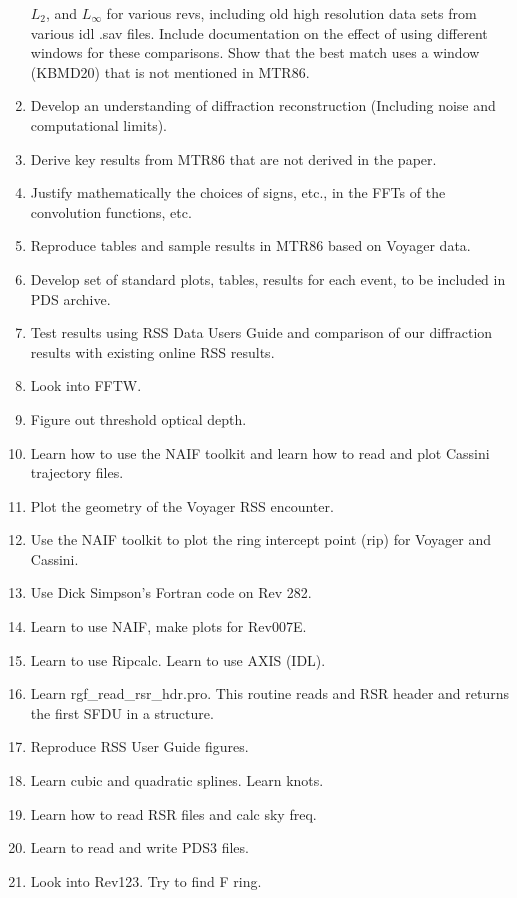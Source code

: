 \documentclass[crop=false,class=article,oneside]{standalone}
\begin{document}
\begin{enumerate}
                  $L_{2}$, and $L_{\infty}$ for various revs, including
                  old high resolution data sets from various idl .sav
                  files. Include documentation on the effect of using
                  different windows for these comparisons. Show that
                  the best match uses a window (KBMD20) that is not
                  mentioned in MTR86.
            \item Develop an understanding of diffraction
                  reconstruction (Including noise
                  and computational limits).
            \item Derive key results from MTR86 that are not
                  derived in the paper.
            \item Justify mathematically the choices of signs, etc.,
                  in the FFTs of the convolution functions, etc.
            \item Reproduce tables and sample results in MTR86
                  based on Voyager data.
            \item Develop set of standard plots, tables, results
                  for each event, to be included in PDS archive.
            \item Test results using RSS Data Users Guide and
                  comparison of our diffraction results with
                  existing online RSS results.
            \item Look into FFTW.
            \item Figure out threshold optical depth.
            \item Learn how to use the NAIF toolkit and learn
                  how to read and plot Cassini trajectory files.
            \item Plot the geometry of the Voyager RSS encounter.
            \item Use the NAIF toolkit to plot the ring
                  intercept point (rip) for Voyager and Cassini.
            \item Use Dick Simpson's Fortran code on Rev 282.
            \item Learn to use NAIF, make plots for Rev007E.
            \item Learn to use Ripcalc. Learn to use AXIS (IDL).
            \item Learn rgf\_read\_rsr\_hdr.pro. 
                  This routine reads and RSR header and returns
                  the first SFDU in a structure.
            \item Reproduce RSS User Guide figures.
            \item Learn cubic and quadratic splines. Learn knots.
            \item Learn how to read RSR files and calc sky freq.
            \item Learn to read and write PDS3 files.
            \item Look into Rev123. Try to find F ring.
        \end{enumerate}
\end{document}

